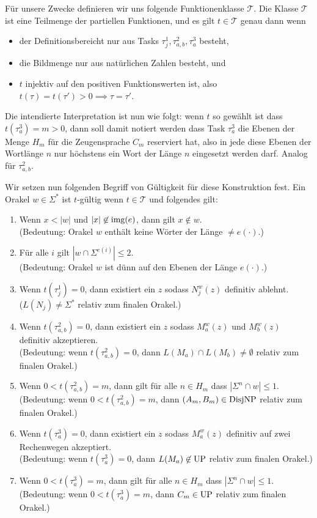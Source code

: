 Für unsere Zwecke definieren wir uns folgende Funktionenklasse $\mathcal T$. Die Klasse $\mathcal T$ ist eine Teilmenge der partiellen Funktionen, und es gilt $t\in\mathcal T$ genau dann wenn 
\begin{itemize}[nosep]
    \item der Definitionsbereicht nur aus Tasks $\tau^1_j, \tau^2_{a,b}, \tau^3_a$ besteht, 
    \item die Bildmenge nur aus natürlichen Zahlen besteht, und
    \item $t$ injektiv auf den positiven Funktionswerten ist, also $t(\tau)=t(\tau')>0 \implies \tau=\tau'$.
\end{itemize}
Die intendierte Interpretation ist nun wie folgt: wenn $t$ so gewählt ist dass $t(\tau^3_a)=m>0$, dann soll damit notiert werden dass Task $\tau^3_a$ die Ebenen der Menge $H_m$ für die Zeugensprache $C_m$ reserviert hat, also in jede diese Ebenen der Wortlänge $n$ nur höchstens ein Wort der Länge $n$ eingesetzt werden darf. Analog für $\tau^2_{a,b}$.

Wir setzen nun folgenden Begriff von Gültigkeit für diese Konstruktion fest.
Ein Orakel $w\in\Sigma^*$ ist $t$-gültig wenn $t\in\mathcal T$ und folgendes gilt:
\begin{enumerate}[label={V\arabic*}]
    \item Wenn $x<|w|$ und $|x|\not\in \operatorname{img}(e)$, dann gilt $x\not\in w$.\\
        (Bedeutung: Orakel $w$ enthält keine Wörter der Länge $\neq e(\cdot)$.)
    \item Für alle $i$ gilt $|w\cap \Sigma^{e(i)}|\leq 2$.\\
        (Bedeutung: Orakel $w$ ist dünn auf den Ebenen der Länge $e(\cdot)$.)
    \item Wenn $t(\tau^1_j)=0$, dann existiert ein $z$ sodass $N_j^w(z)$ definitiv ablehnt.\\
        ($L(N_j)\neq \Sigma^*$ relativ zum finalen Orakel.)
    \item Wenn $t(\tau^2_{a,b})=0$, dann existiert ein $z$ sodass $M_a^w(z)$ und $M_b^w(z)$ definitiv akzeptieren.\\
        (Bedeutung: wenn $t(\tau^2_{a,b})=0$, dann $L(M_a)\cap L(M_b)\neq \emptyset$ relativ zum finalen Orakel.)
    \item Wenn $0<t(\tau^2_{a,b})=m$, dann gilt für alle $n\in H_m$ dass $|\Sigma^{n}\cap w|\leq 1$.\\
        (Bedeutung: wenn $0<t(\tau^2_{a,b})=m$, dann $(A_m,B_m)\in\mathrm{DisjNP}$ relativ zum finalen Orakel.)
    \item Wenn $t(\tau^3_{a})=0$, dann existiert ein $z$ sodass $M_a^w(z)$ definitiv auf zwei Rechenwegen akzeptiert.\\
        (Bedeutung: wenn $t(\tau^3_{a})=0$, dann $L(M_a)\not\in \mathrm{UP}$ relativ zum finalen Orakel.)
    \item Wenn $0<t(\tau^3_{a})=m$, dann gilt für alle $n\in H_m$ dass $|\Sigma^n\cap w|\leq 1$.\\
        (Bedeutung: wenn $0<t(\tau^3_{a})=m$, dann $C_m\in\mathrm{UP}$ relativ zum finalen Orakel.)
\end{enumerate}



